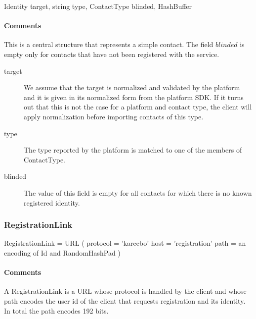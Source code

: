 \documentclass[a4paper,10pt]{article}
\begin{document}
\begin{verbbox}
Identity
{
  target, string
  type, ContactType
  blinded, HashBuffer
}
\end{verbbox}
\begin{center}
\theverbbox
\end{center}

\begin{inparaitem}[ ]
 \item \infrastructure
\end{inparaitem}

\paragraph*{Comments}
This is a central structure that represents a simple contact. The field $blinded$ is empty only for contacts that have not been registered with the service.

\SpecialItem
\begin{description}
 \item[target] We assume that the target is normalized and validated by the platform and it is given in its normalized form from the platform SDK. If it turns out that this is not 
the case for a platform and contact type, the client will apply normalization before importing contacts of this type.
 \item[type] The type reported by the platform is matched to one of the members of ContactType.
 \item[blinded] The value of this field is empty for all contacts for which there is no known registered identity.
\end{description}

\subsubsection{RegistrationLink}

\begin{verbbox}
RegistrationLink = URL
(
  protocol = 'kareebo'
  host = 'registration'
  path = an encoding of Id and RandomHashPad
)
\end{verbbox}
\begin{center}
\theverbbox
\end{center}

\begin{inparaitem}[ ]
 \item \infrastructure
\end{inparaitem}

\paragraph*{Comments}
A RegistrationLink is a URL whose protocol is handled by the client and whose path encodes the user id of the client that requests registration and its identity. In total the path 
encodes 192 bits.
\end{document}
